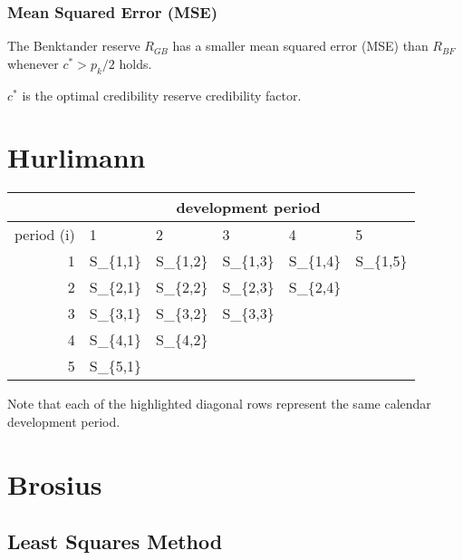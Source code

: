 \documentclass{article}
\begin{document}
\subsubsection{Mean Squared Error (MSE)}

The Benktander reserve $R_{GB}$ has a smaller mean squared error
(MSE) than $R_{BF}$ whenever $c^* > p_k / 2$ holds.

$c^*$ is the optimal credibility reserve credibility factor.

\newpage

\section{Hurlimann }

\begin{center}
  \begin{tabular}{|r|l|l|l|l|l|}
    \hline
    & \multicolumn{5}{c|}{development period} \\
    \hline
    period (i) & 1 & 2 & 3 & 4 & 5 \\
    \hline
    1 & S\_\{1,1\} & \cellcolor{blue!50}S\_\{1,2\} &
    \cellcolor{yellow!20}S\_\{1,3\} &
    \cellcolor{yellow!80}S\_\{1,4\} & \cellcolor{purple!20}S\_\{1,5\} \\
    \hline
    2 & \cellcolor{blue!50}S\_\{2,1\} & \cellcolor{yellow!20}S\_\{2,2\} &
    \cellcolor{yellow!80}S\_\{2,3\} & \cellcolor{purple!20}S\_\{2,4\} &  \\
    \hline
    3 & \cellcolor{yellow!20}S\_\{3,1\} & \cellcolor{yellow!80}S\_\{3,2\} &
    \cellcolor{purple!20}S\_\{3,3\} &  &  \\
    \hline
    4 & \cellcolor{yellow!80}S\_\{4,1\} &
    \cellcolor{purple!20}S\_\{4,2\} &  &  &  \\
    \hline
    5 & \cellcolor{purple!20}S\_\{5,1\} &  &  &  &  \\
    \hline
  \end{tabular}
\end{center}

Note that each of the highlighted diagonal rows represent the same
calendar development period.

\newpage
\section{Brosius}

\subsection{Least Squares Method}
\end{document}
